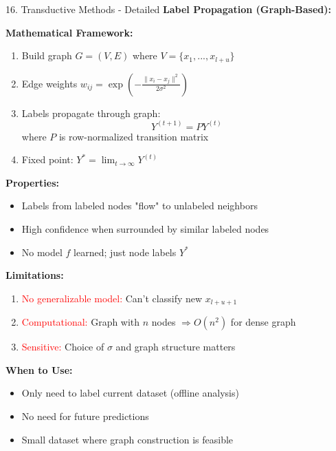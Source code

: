 \documentclass[8pt]{beamer}
\begin{document}
	\begin{frame}{16. Transductive Methods - Detailed}
		\fontsize{6.5}{7.5}\selectfont
		\textbf{Label Propagation (Graph-Based):}
		
		\textbf{Mathematical Framework:}
		\begin{enumerate}
			\item Build graph $G = (V,E)$ where $V = \{x_1,...,x_{l+u}\}$
			\item Edge weights $w_{ij} = \exp\left(-\frac{\|x_i - x_j\|^2}{2\sigma^2}\right)$
			\item Labels propagate through graph:
			\[
			Y^{(t+1)} = P Y^{(t)}
			\]
			where $P$ is row-normalized transition matrix
			\item Fixed point: $Y^* = \lim_{t \to \infty} Y^{(t)}$
		\end{enumerate}
		
		\textbf{Properties:}
		\begin{itemize}
			\item Labels from labeled nodes "flow" to unlabeled neighbors
			\item High confidence when surrounded by similar labeled nodes
			\item No model $f$ learned; just node labels $Y^*$
		\end{itemize}
		
		\textbf{Limitations:}
		\begin{enumerate}
			\item \textcolor{red}{No generalizable model:} Can't classify new $x_{l+u+1}$
			\item \textcolor{red}{Computational:} Graph with $n$ nodes $\Rightarrow O(n^2)$ for dense graph
			\item \textcolor{red}{Sensitive:} Choice of $\sigma$ and graph structure matters
		\end{enumerate}
		
		\textbf{When to Use:}
		\begin{itemize}
			\item Only need to label current dataset (offline analysis)
			\item No need for future predictions
			\item Small dataset where graph construction is feasible
		\end{itemize}
	\end{frame}
	
\end{document}
